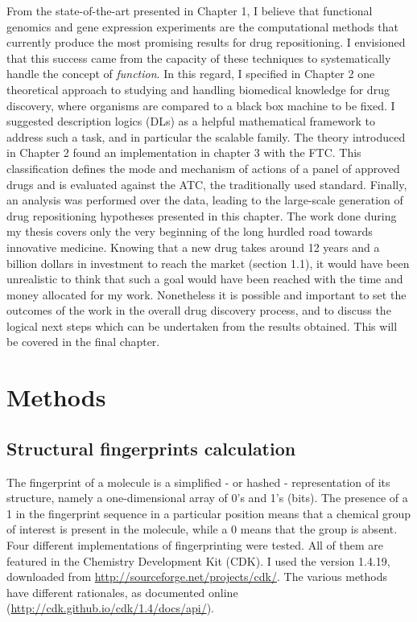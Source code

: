 From the state-of-the-art presented in Chapter 1, I believe that functional genomics and gene expression experiments are the computational methods that currently produce the most promising results for drug repositioning. I envisioned that this success came from the capacity of these techniques to systematically handle the concept of \emph{function}. In this regard, I specified in Chapter 2 one theoretical approach to studying and handling biomedical knowledge for drug discovery, where organisms are compared to a black box machine to be fixed. I suggested description logics (DLs) as a helpful mathematical framework to address such a task, and in particular the scalable  family. The theory introduced in Chapter 2 found an implementation in chapter 3 with the FTC. This classification defines the mode and mechanism of actions of a panel of approved drugs and is evaluated against the ATC, the traditionally used standard. Finally, an analysis was performed over the data, leading to the large-scale generation of drug repositioning hypotheses presented in this chapter. The work done during my thesis covers only the very beginning of the long hurdled road towards innovative medicine. Knowing that a new drug takes around 12 years and a billion dollars in investment to reach the market (section 1.1), it would have been unrealistic to think that such a goal would have been reached with the time and money allocated for my work. Nonetheless it is possible and important to set the outcomes of the work in the overall drug discovery process, and to discuss the logical next steps which can be undertaken from the results obtained. This will be covered in the final chapter.

\section{Methods}

\subsection{Structural fingerprints calculation}
The fingerprint of a molecule is a simplified - or hashed - representation of its structure, namely a one-dimensional array of 0's and 1's (bits). The presence of a 1 in the fingerprint sequence in a particular position means that a chemical group of interest is present in the molecule, while a 0 means that the group is absent. 
Four different implementations of fingerprinting were tested. All of them are featured in the Chemistry Development Kit (CDK). I used the version 1.4.19, downloaded from \url{http://sourceforge.net/projects/cdk/}. The various methods have different rationales, as documented online (\url{http://cdk.github.io/cdk/1.4/docs/api/}).

